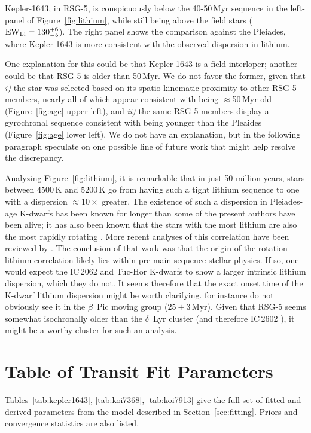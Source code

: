 \documentclass[12pt,twocolumn,linenumbers]{aastex63}
\begin{document}
Kepler-1643, in RSG-5, is conspicuously below the 40-50$\,$Myr sequence
in the left-panel of Figure~\ref{fig:lithium}, while still being above
the field stars (${\rm EW}_{\rm Li} = 130^{+6}_{-5}$).
The right panel shows the comparison against the Pleiades, where
Kepler-1643 is more consistent with the observed dispersion in lithium.

One explanation for this could be that Kepler-1643 is a field
interloper; another could be that RSG-5 is older than 50\,Myr.  We do
not favor the former, given that {\it i)} the star was selected based
on its spatio-kinematic proximity to other RSG-5 members, nearly all
of which appear consistent with being $\approx$50\,Myr old
(Figure~\ref{fig:age} upper left), and {\it ii)} the same RSG-5
members display a gyrochronal sequence consistent with being younger
than the Pleaides (Figure~\ref{fig:age} lower left).
We do not have an explanation, but in the following paragraph
speculate on one possible line of future work that might help resolve the
discrepancy.

Analyzing Figure~\ref{fig:lithium}, it is remarkable that in just 50
million years, stars between $4500$\,K and $5200$\,K go from having
such a tight lithium sequence to one with a dispersion
$\approx10\times$ greater.  The existence of such a dispersion in
Pleiades-age K-dwarfs has been known for longer than some of the
present authors have been alive; it has also been known that the stars
with the most lithium are also the most rapidly rotating
\citep{butler_pleiades_1987,soderblom_evolution_1993}.  More recent
analyses of this correlation have been reviewed by
\citet{bouvier_lithium-rotation_2020}.  The conclusion of that work
was that the origin of the rotation-lithium correlation likely lies
within pre-main-sequence stellar physics.  If so, one would expect the
IC\,2062 and Tuc-Hor K-dwarfs to show a larger intrinsic lithium
dispersion, which they do not.  It seems therefore that the exact
onset time of the K-dwarf lithium dispersion might be worth
clarifying.  \citet{messina_rotation-lithium_2016} for instance do not
obviously see it in the $\beta$~Pic moving group ($25\pm3$\,Myr).
Given that RSG-5 seems somewhat isochronally older than the
$\delta$~Lyr cluster (and therefore IC\,2602
\citealt{bouma_kep1627_2022}), it might be a worthy cluster for such
an analysis.


\section{Table of Transit Fit Parameters}
\label{app:transit}

Tables~\ref{tab:kepler1643}, \ref{tab:koi7368}, \ref{tab:koi7913} give
the full set of fitted and derived parameters from the model described in
Section~\ref{sec:fitting}.
Priors and convergence statistics are also listed.









\end{document}
